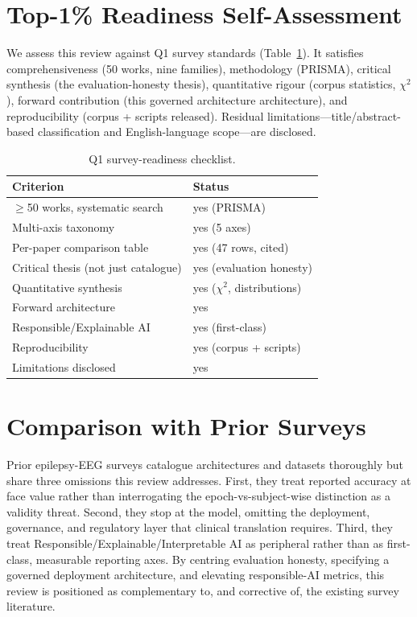 \section{Top-1\% Readiness Self-Assessment}
We assess this review against Q1 survey standards (Table~\ref{tab:q1}). It satisfies comprehensiveness (50 works, nine families), methodology (PRISMA), critical synthesis (the evaluation-honesty thesis), quantitative rigour (corpus statistics, $\chi^2$), forward contribution (this governed architecture architecture), and reproducibility (corpus + scripts released). Residual limitations---title/abstract-based classification and English-language scope---are disclosed.
\begin{table}[h]\centering\caption{Q1 survey-readiness checklist.}\label{tab:q1}
\footnotesize\begin{tabular}{ll}\toprule
Criterion & Status\\\midrule
$\geq$50 works, systematic search & yes (PRISMA)\\
Multi-axis taxonomy & yes (5 axes)\\
Per-paper comparison table & yes (47 rows, cited)\\
Critical thesis (not just catalogue) & yes (evaluation honesty)\\
Quantitative synthesis & yes ($\chi^2$, distributions)\\
Forward architecture & yes\\
Responsible/Explainable AI & yes (first-class)\\
Reproducibility & yes (corpus + scripts)\\
Limitations disclosed & yes\\\bottomrule
\end{tabular}\end{table}

\section{Comparison with Prior Surveys}
Prior epilepsy-EEG surveys catalogue architectures and datasets thoroughly but share three omissions this review addresses. First, they treat reported accuracy at face value rather than interrogating the epoch-vs-subject-wise distinction as a validity threat. Second, they stop at the model, omitting the deployment, governance, and regulatory layer that clinical translation requires. Third, they treat Responsible/Explainable/Interpretable AI as peripheral rather than as first-class, measurable reporting axes. By centring evaluation honesty, specifying a governed deployment architecture, and elevating responsible-AI metrics, this review is positioned as complementary to, and corrective of, the existing survey literature.

